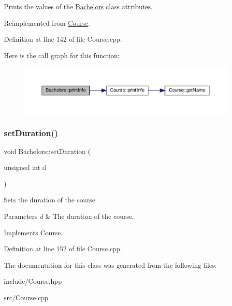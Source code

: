 Prints the values of the \hyperlink{classBachelors}{Bachelors}\textquotesingle{} class attributes. 

Reimplemented from \hyperlink{classCourse_a3248ecd5df196cf50ce379ec37758c59}{Course}.



Definition at line 142 of file Course.\+cpp.

Here is the call graph for this function\+:\nopagebreak
\begin{figure}[H]
\begin{center}
\leavevmode
\includegraphics[width=350pt]{classBachelors_a25005e4fb6cfaddb749d13be04568c8b_cgraph}
\end{center}
\end{figure}
\mbox{\label{classBachelors_adc2891e100ef21476e77efe6402e7580}} 
\subsubsection{\texorpdfstring{set\+Duration()}{setDuration()}}
{\footnotesize\ttfamily void Bachelors\+::set\+Duration (\begin{DoxyParamCaption}\item[{unsigned int}]{d }\end{DoxyParamCaption})\hspace{0.3cm}{\ttfamily [virtual]}}

Sets the duration of the course. 
\begin{DoxyParams}{Parameters}
{\em d} & The duration of the course. \\
\hline
\end{DoxyParams}


Implements \hyperlink{classCourse}{Course}.



Definition at line 152 of file Course.\+cpp.



The documentation for this class was generated from the following files\+:\begin{DoxyCompactItemize}
\item 
include/Course.\+hpp\item 
src/Course.\+cpp\end{DoxyCompactItemize}
